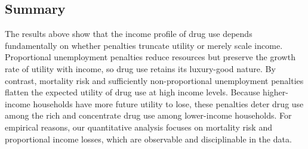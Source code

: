\documentclass[parskip=full]{article}
\theoremstyle{plain}      %
\theoremstyle{remark}    %
\begin{document}
\subsection{Summary}

The results above show that the income profile of drug use depends fundamentally on whether penalties truncate utility or merely scale income. Proportional unemployment penalties reduce resources but preserve the growth rate of utility with income, so drug use retains its luxury-good nature. By contrast, mortality risk and sufficiently non-proportional unemployment penalties flatten the expected utility of drug use at high income levels. Because higher-income households have more future utility to lose, these penalties deter drug use among the rich and concentrate drug use among lower-income households. For empirical reasons, our quantitative analysis focuses on mortality risk and proportional income losses, which are observable and disciplinable in the data.



\vspace{1cm}
\end{document}

